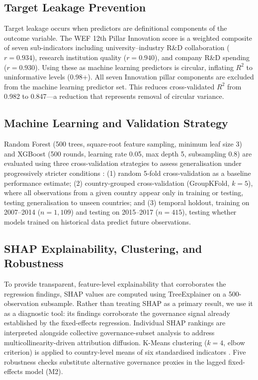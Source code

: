\documentclass[pdflatex,sn-apa]{sn-jnl}
\begin{document}
\subsection{Target Leakage Prevention}
\label{sec:targetleakage}

Target leakage occurs when predictors are definitional components of the outcome variable. The WEF 12th Pillar Innovation score is a weighted composite of seven sub-indicators including university--industry R\&D collaboration ($r=0.934$), research institution quality ($r=0.940$), and company R\&D spending ($r=0.930$). Using these as machine learning predictors is circular, inflating $R^2$ to uninformative levels (0.98+). All seven Innovation pillar components are excluded from the machine learning predictor set. This reduces cross-validated $R^2$ from 0.982 to 0.847---a reduction that represents removal of circular variance.

\subsection{Machine Learning and Validation Strategy}

Random Forest \citep{breiman2001} (500 trees, square-root feature sampling, minimum leaf size 3) and XGBoost \citep{chen2016} (500 rounds, learning rate 0.05, max depth 5, subsampling 0.8) are evaluated using three cross-validation strategies to assess generalisation under progressively stricter conditions \citep{chernozhukov2018,athey2019}: (1) random 5-fold cross-validation as a baseline performance estimate; (2) country-grouped cross-validation (GroupKFold, $k=5$), where all observations from a given country appear only in training or testing, testing generalisation to unseen countries; and (3) temporal holdout, training on 2007--2014 ($n=1{,}109$) and testing on 2015--2017 ($n=415$), testing whether models trained on historical data predict future observations.

\subsection{SHAP Explainability, Clustering, and Robustness}

To provide transparent, feature-level explainability that corroborates the regression findings, SHAP values \citep{lundberg2017} are computed using TreeExplainer on a 500-observation subsample. Rather than treating SHAP as a primary result, we use it as a diagnostic tool: its findings corroborate the governance signal already established by the fixed-effects regression. Individual SHAP rankings are interpreted alongside collective governance-subset analysis to address multicollinearity-driven attribution diffusion. K-Means clustering ($k=4$, elbow criterion) is applied to country-level means of six standardised indicators \citep{hair2014}. Five robustness checks substitute alternative governance proxies in the lagged fixed-effects model (M2).
\end{document}
